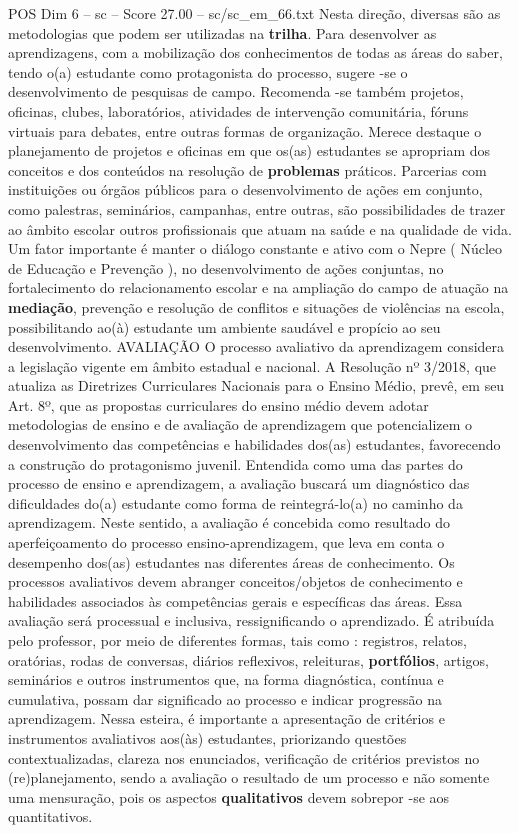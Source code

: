 \begin{textsample}{POS Dim 6 – sc – Score 27.00 – sc/sc\_em\_66.txt}
Nesta direção, diversas são as metodologias que podem ser utilizadas na \textbf{trilha}.
Para desenvolver as aprendizagens, com a mobilização dos conhecimentos de todas as áreas do saber, tendo o(a) estudante como protagonista do processo, sugere -se o desenvolvimento de pesquisas de campo.
Recomenda -se também projetos, oficinas, clubes, laboratórios, atividades de intervenção comunitária, fóruns virtuais para debates, entre outras formas de organização.
Merece destaque o planejamento de projetos e oficinas em que os(as) estudantes se apropriam dos conceitos e dos conteúdos na resolução de \textbf{problemas} práticos.
Parcerias com instituições ou órgãos públicos para o desenvolvimento de ações em conjunto, como palestras, seminários, campanhas, entre outras, são possibilidades de trazer ao âmbito escolar outros profissionais que atuam na saúde e na qualidade de vida.
Um fator importante é manter o diálogo constante e ativo com o Nepre ( Núcleo de Educação e Prevenção ), no desenvolvimento de ações conjuntas, no fortalecimento do relacionamento escolar e na ampliação do campo de atuação na \textbf{mediação}, prevenção e resolução de conflitos e situações de violências na escola, possibilitando ao(à) estudante um ambiente saudável e propício ao seu desenvolvimento.
AVALIAÇÃO O processo avaliativo da aprendizagem considera a legislação vigente em âmbito estadual e nacional.
A Resolução nº 3/2018, que atualiza as Diretrizes Curriculares Nacionais para o Ensino Médio, prevê, em seu Art. 8º, que as propostas curriculares do ensino médio devem adotar metodologias de ensino e de avaliação de aprendizagem que potencializem o desenvolvimento das competências e habilidades dos(as) estudantes, favorecendo a construção do protagonismo juvenil.
Entendida como uma das partes do processo de ensino e aprendizagem, a avaliação buscará um diagnóstico das dificuldades do(a) estudante como forma de reintegrá-lo(a) no caminho da aprendizagem.
Neste sentido, a avaliação é concebida como resultado do aperfeiçoamento do processo ensino-aprendizagem, que leva em conta o desempenho dos(as) estudantes nas diferentes áreas de conhecimento.
Os processos avaliativos devem abranger conceitos/objetos de conhecimento e habilidades associados às competências gerais e específicas das áreas.
Essa avaliação será processual e inclusiva, ressignificando o aprendizado.
É atribuída pelo professor, por meio de diferentes formas, tais como : registros, relatos, oratórias, rodas de conversas, diários reflexivos, releituras, \textbf{portfólios}, artigos, seminários e outros instrumentos que, na forma diagnóstica, contínua e cumulativa, possam dar significado ao processo e indicar progressão na aprendizagem.
Nessa esteira, é importante a apresentação de critérios e instrumentos avaliativos aos(às) estudantes, priorizando questões contextualizadas, clareza nos enunciados, verificação de critérios previstos no (re)planejamento, sendo a avaliação o resultado de um processo e não somente uma mensuração, pois os aspectos \textbf{qualitativos} devem sobrepor -se aos quantitativos.


\end{textsample}

